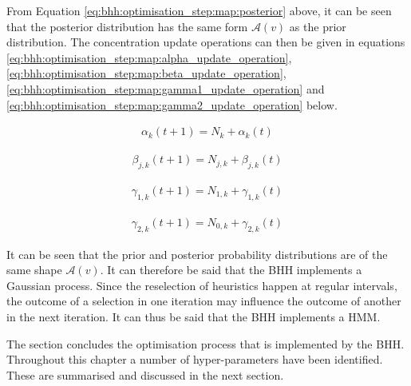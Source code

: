 From Equation \ref{eq:bhh:optimisation_step:map:posterior} above, it can be seen that the posterior distribution has the same form $\mathcal{A}(v)$ as the prior distribution. The concentration update operations can then be given in equations \ref{eq:bhh:optimisation_step:map:alpha_update_operation}, \ref{eq:bhh:optimisation_step:map:beta_update_operation}, \ref{eq:bhh:optimisation_step:map:gamma1_update_operation} and \ref{eq:bhh:optimisation_step:map:gamma2_update_operation} below.

\begin{equation}
      \label{eq:bhh:optimisation_step:map:alpha_update_operation}
      \begin{split}
            \alpha_{k}(t+1) = N_{k} + \alpha_{k}(t)
      \end{split}
\end{equation}

\begin{equation}
      \label{eq:bhh:optimisation_step:map:beta_update_operation}
      \begin{split}
            \beta_{j,k}(t+1) = N_{j,k} + \beta_{j,k}(t)
      \end{split}
\end{equation}

\begin{equation}
      \label{eq:bhh:optimisation_step:map:gamma1_update_operation}
      \begin{split}
            \gamma_{1,k}(t+1) = N_{1,k} + \gamma_{1,k}(t)
      \end{split}
\end{equation}

\begin{equation}
      \label{eq:bhh:optimisation_step:map:gamma2_update_operation}
      \begin{split}
            \gamma_{2,k}(t+1) = N_{0,k} + \gamma_{2,k}(t)
      \end{split}
\end{equation}

It can be seen that the prior and posterior probability distributions are of the same shape $\mathcal{A}(v)$. It can therefore be said that the \ac{BHH} implements a Gaussian process. Since the reselection of heuristics happen at regular intervals, the outcome of a selection in one iteration may influence the outcome of another in the next iteration. It can thus be said that the \ac{BHH} implements a \ac{HMM}.

The section concludes the optimisation process that is implemented by the \ac{BHH}. Throughout this chapter a number of hyper-parameters have been identified. These are summarised and discussed in the next section.


